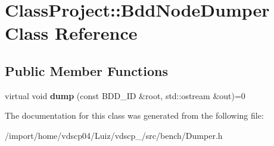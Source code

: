 \section{Class\+Project\+:\+:Bdd\+Node\+Dumper Class Reference}
\label{classClassProject_1_1BddNodeDumper}
\subsection*{Public Member Functions}
\begin{DoxyCompactItemize}
\item 
virtual void {\bfseries dump} (const B\+D\+D\+\_\+\+ID \&root, std\+::ostream \&out)=0\label{classClassProject_1_1BddNodeDumper_a611562f9f308c185375a6270b603e572}

\end{DoxyCompactItemize}


The documentation for this class was generated from the following file\+:\begin{DoxyCompactItemize}
\item 
/import/home/vdscp04/\+Luiz/vdscp\+\_/src/bench/Dumper.\+h\end{DoxyCompactItemize}
